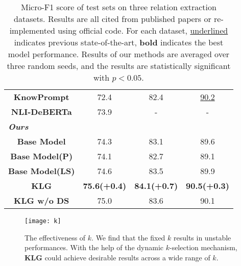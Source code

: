 \begin{table}[]
\begin{tabular}{cccc}
\multicolumn{1}{c|}{\textbf{KnowPrompt}}      & \multicolumn{1}{c|}{72.4}                & \multicolumn{1}{c|}{82.4}                    & \multicolumn{1}{c}{\underline{90.2}}                                        \\
\multicolumn{1}{c|}{\textbf{NLI-DeBERTa}}     & \multicolumn{1}{c|}{73.9}                & \multicolumn{1}{c|}{-}                       & -                                        \\ \hline
\multicolumn{4}{l}{\textit{\textbf{Ours}}}                                                                                                                                         \\ \hline
\multicolumn{1}{c|}{\textbf{Base Model}}             & \multicolumn{1}{c|}{74.3} & \multicolumn{1}{c|}{83.1}     & 89.6                      \\
\multicolumn{1}{c|}{\textbf{Base Model(P)}}             & \multicolumn{1}{c|}{74.1} & \multicolumn{1}{c|}{82.7}     & 89.1                      \\
\multicolumn{1}{c|}{\textbf{Base Model(LS)}}             & \multicolumn{1}{c|}{74.6} & \multicolumn{1}{c|}{83.5}     & 89.9                      \\
\multicolumn{1}{c|}{\textbf{KLG}}             & \multicolumn{1}{c|}{\textbf{75.6(+0.4)}} & \multicolumn{1}{c|}{\textbf{84.1(+0.7)}}     & \textbf{90.5(+0.3)}                      \\ 
\multicolumn{1}{c|}{\textbf{KLG w/o DS}}             & \multicolumn{1}{c|}{75.0} & \multicolumn{1}{c|}{83.6}     & 90.1                      \\
\bottomrule[1.5pt]
\end{tabular}
\caption{Micro-F1 score of test sets on three relation extraction datasets. Results are all cited from published papers or re-implemented using official code. For each dataset, \underline{underlined} indicates previous state-of-the-art, \textbf{bold} indicates the best model performance. Results of our methods are averaged over three random seeds, and the results are statistically significant with $p < 0.05$.}
\label{main}
\end{table}




\begin{figure}[h]
	\centering
	\texttt{[image: k]}
	\caption{The effectiveness of $k$. We find that the fixed $k$ results in unstable performances. With the help of the dynamic $k$-selection mechanism, \textbf{KLG} could achieve desirable results across a wide range of $k$.}
	\label{k_number}
\end{figure}

